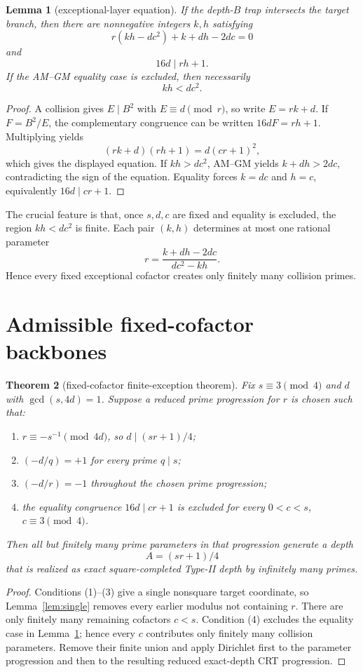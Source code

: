 \documentclass[11pt]{article}
\newtheorem{theorem}{Theorem}
\newtheorem{lemma}[theorem]{Lemma}
\theoremstyle{definition}
\begin{document}
\begin{lemma}[exceptional-layer equation]\label{lem:master}
If the depth-$B$ trap intersects the target branch, then there are nonnegative integers $k,h$ satisfying
\[
\boxed{r(kh-dc^2)+k+dh-2dc=0}
\]
and
\[
16d\mid rh+1.
\]
If the AM--GM equality case is excluded, then necessarily
\[
\boxed{kh<dc^2.}
\]
\end{lemma}

\begin{proof}
A collision gives $E\mid B^2$ with $E\equiv d\pmod r$, so write $E=rk+d$. If $F=B^2/E$, the complementary congruence can be written $16dF=rh+1$. Multiplying yields
\[
(rk+d)(rh+1)=d(cr+1)^2,
\]
which gives the displayed equation. If $kh>dc^2$, AM--GM yields $k+dh>2dc$, contradicting the sign of the equation. Equality forces $k=dc$ and $h=c$, equivalently $16d\mid cr+1$.
\end{proof}

The crucial feature is that, once $s,d,c$ are fixed and equality is excluded, the region $kh<dc^2$ is finite. Each pair $(k,h)$ determines at most one rational parameter
\[
r=\frac{k+dh-2dc}{dc^2-kh}.
\]
Hence every fixed exceptional cofactor creates only finitely many collision primes.

\section{Admissible fixed-cofactor backbones}
\begin{theorem}[fixed-cofactor finite-exception theorem]\label{thm:fixed}
Fix $s\equiv3\pmod4$ and $d$ with $\gcd(s,4d)=1$. Suppose a reduced prime progression for $r$ is chosen such that:
\begin{enumerate}
\item $r\equiv-s^{-1}\pmod{4d}$, so $d\mid(sr+1)/4$;
\item $(-d/q)=+1$ for every prime $q\mid s$;
\item $(-d/r)=-1$ throughout the chosen prime progression;
\item the equality congruence $16d\mid cr+1$ is excluded for every $0<c<s$, $c\equiv3\pmod4$.
\end{enumerate}
Then all but finitely many prime parameters in that progression generate a depth
\[
\boxed{A=(sr+1)/4}
\]
that is realized as exact square-completed Type-II depth by infinitely many primes.
\end{theorem}

\begin{proof}
Conditions (1)--(3) give a single nonsquare target coordinate, so Lemma~\ref{lem:single} removes every earlier modulus not containing $r$. There are only finitely many remaining cofactors $c<s$. Condition (4) excludes the equality case in Lemma~\ref{lem:master}; hence every $c$ contributes only finitely many collision parameters. Remove their finite union and apply Dirichlet first to the parameter progression and then to the resulting reduced exact-depth CRT progression.
\end{proof}
\end{document}
